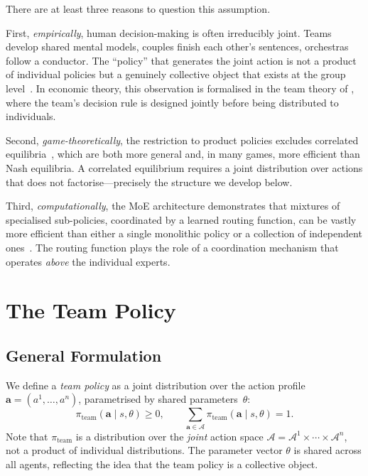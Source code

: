 There are at least three reasons to question this assumption.

First, \emph{empirically}, human decision-making is often irreducibly joint. Teams develop shared mental models, couples finish each other's sentences, orchestras follow a conductor. The ``policy'' that generates the joint action is not a product of individual policies but a genuinely collective object that exists at the group level~\cite{bratman1993,tuomela2005}. In economic theory, this observation is formalised in the team theory of \cite{marschak1972}, where the team's decision rule is designed jointly before being distributed to individuals.

Second, \emph{game-theoretically}, the restriction to product policies excludes correlated equilibria~\cite{aumann1974}, which are both more general and, in many games, more efficient than Nash equilibria. A correlated equilibrium requires a joint distribution over actions that does not factorise---precisely the structure we develop below.

Third, \emph{computationally}, the MoE architecture demonstrates that mixtures of specialised sub-policies, coordinated by a learned routing function, can be vastly more efficient than either a single monolithic policy or a collection of independent ones~\cite{shazeer2017,deepseekv3}. The routing function plays the role of a coordination mechanism that operates \emph{above} the individual experts.

\section{The Team Policy}
\label{sec:team-policy}

\subsection{General Formulation}
\label{subsec:team-general}

We define a \emph{team policy} as a joint distribution over the action profile $\bm{a}=(a^1,\ldots,a^n)$, parametrised by shared parameters~$\theta$:
\begin{equation}\label{eq:team-policy}
  \pi_{\mathrm{team}}(\bm{a}\mid s,\theta) \ge 0, \qquad
  \sum_{\bm{a}\in\bm{\mathcal{A}}} \pi_{\mathrm{team}}(\bm{a}\mid s,\theta) = 1.
\end{equation}
Note that $\pi_{\mathrm{team}}$ is a distribution over the \emph{joint} action space $\bm{\mathcal{A}}=\mathcal{A}^1\times\cdots\times\mathcal{A}^n$, not a product of individual distributions. The parameter vector $\theta$ is shared across all agents, reflecting the idea that the team policy is a collective object.

